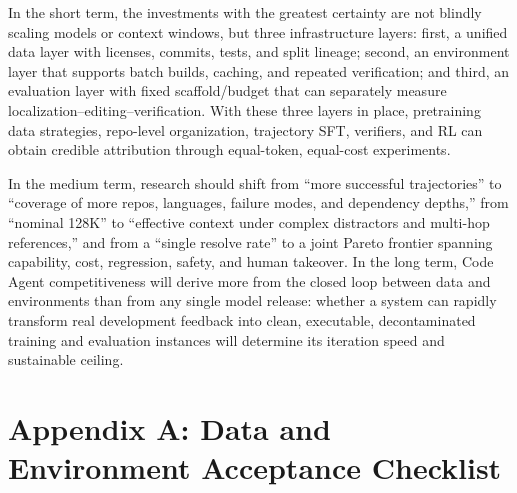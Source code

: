 \documentclass[10pt,a4paper,UTF8,fontset=none]{ctexart}
\begin{document}
In the short term, the investments with the greatest certainty are not blindly scaling models or context windows, but three infrastructure layers: first, a unified data layer with licenses, commits, tests, and split lineage; second, an environment layer that supports batch builds, caching, and repeated verification; and third, an evaluation layer with fixed scaffold/budget that can separately measure localization--editing--verification. With these three layers in place, pretraining data strategies, repo-level organization, trajectory SFT, verifiers, and RL can obtain credible attribution through equal-token, equal-cost experiments.

In the medium term, research should shift from ``more successful trajectories'' to ``coverage of more repos, languages, failure modes, and dependency depths,'' from ``nominal 128K'' to ``effective context under complex distractors and multi-hop references,'' and from a ``single resolve rate'' to a joint Pareto frontier spanning capability, cost, regression, safety, and human takeover. In the long term, Code Agent competitiveness will derive more from the closed loop between data and environments than from any single model release: whether a system can rapidly transform real development feedback into clean, executable, decontaminated training and evaluation instances will determine its iteration speed and sustainable ceiling.

\clearpage
\appendix
\section{Appendix A: Data and Environment Acceptance Checklist}
\end{document}
